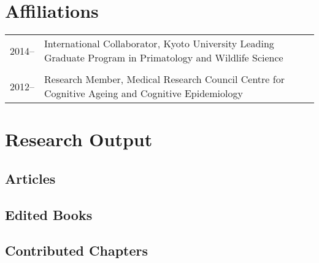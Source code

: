 \documentclass[11pt]{article}
\begin{document}
\section*{Affiliations}

\begin{tabular}{p{3cm}p{12cm}}
2014-- & International Collaborator, Kyoto University Leading Graduate Program in
Primatology and Wildlife Science \\ \\

2012-- & Research Member, Medical Research Council Centre for
Cognitive Ageing and Cognitive Epidemiology
\end{tabular}

\section*{Research Output}
\subsection*{Articles}

\nocite{*}

\setlength\bibhang{0pt}

\printbibliography[type=article,notkeyword=reviewrevision,heading=none]

\subsection*{Edited Books}

\printbibliography[type=book,notkeyword=reviewrevision,heading=none]

\subsection*{Contributed Chapters}

\printbibliography[type=inbook,notkeyword=reviewrevision,heading=none]



\end{document}
